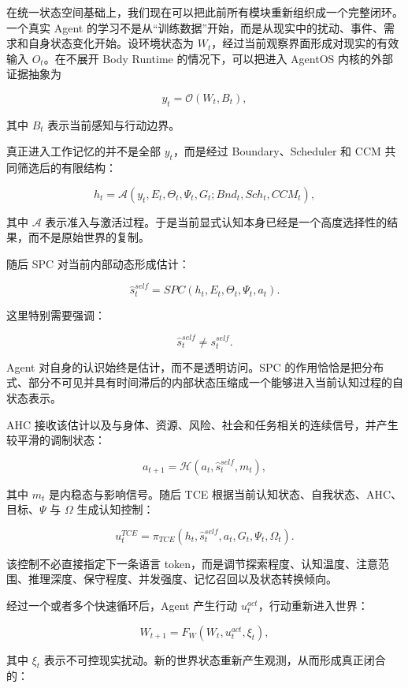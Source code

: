 在统一状态空间基础上，我们现在可以把此前所有模块重新组织成一个完整闭环。一个真实 Agent 的学习不是从“训练数据”开始，而是从现实中的扰动、事件、需求和自身状态变化开始。设环境状态为 $W_t$，经过当前观察界面形成对现实的有效输入 $O_t$。在不展开 Body Runtime 的情况下，可以把进入 AgentOS 内核的外部证据抽象为

\[
y_t
=
\mathcal{O}(W_t,B_t),
\]

其中 $B_t$ 表示当前感知与行动边界。

真正进入工作记忆的并不是全部 $y_t$，而是经过 Boundary、Scheduler 和 CCM 共同筛选后的有限结构：

\[
h_t
=
\mathcal{A}
\left(
y_t,
E_t,
\Theta_t,
\Psi_t,
G_t;
Bnd_t,
Sch_t,
CCM_t
\right),
\]

其中 $\mathcal{A}$ 表示准入与激活过程。于是当前显式认知本身已经是一个高度选择性的结果，而不是原始世界的复制。

随后 SPC 对当前内部动态形成估计：

\[
\hat{s}^{self}_t
=
SPC
\left(
h_t,E_t,\Theta_t,\Psi_t,a_t
\right).
\]

这里特别需要强调：

\[
\boxed{
\hat{s}^{self}_t
\neq
s^{self}_t.
}
\]

Agent 对自身的认识始终是估计，而不是透明访问。SPC 的作用恰恰是把分布式、部分不可见并具有时间滞后的内部状态压缩成一个能够进入当前认知过程的自状态表示。

AHC 接收该估计以及与身体、资源、风险、社会和任务相关的连续信号，并产生较平滑的调制状态：

\[
a_{t+1}
=
\mathcal{H}
\left(
a_t,
\hat{s}^{self}_t,
m_t
\right),
\]

其中 $m_t$ 是内稳态与影响信号。随后 TCE 根据当前认知状态、自我状态、AHC、目标、$\Psi$ 与 $\Omega$ 生成认知控制：

\[
u^{TCE}_t
=
\pi_{TCE}
\left(
h_t,
\hat{s}^{self}_t,
a_t,
G_t,
\Psi_t,
\Omega_t
\right).
\]

该控制不必直接指定下一条语言 token，而是调节探索程度、认知温度、注意范围、推理深度、保守程度、并发强度、记忆召回以及状态转换倾向。

经过一个或者多个快速循环后，Agent 产生行动 $u^{act}_t$，行动重新进入世界：

\[
W_{t+1}
=
F_W(W_t,u^{act}_t,\xi_t),
\]

其中 $\xi_t$ 表示不可控现实扰动。新的世界状态重新产生观测，从而形成真正闭合的：

\begin{statementbox}
\centering
{}
\end{statementbox}

